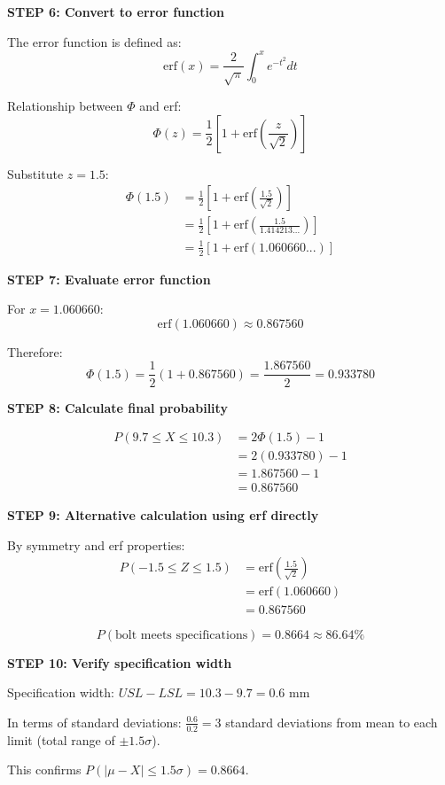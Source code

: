 \documentclass[12pt]{article}
\begin{document}
\begin{solution}
\textbf{STEP 6: Convert to error function}

The error function is defined as:
\[
\text{erf}(x) = \frac{2}{\sqrt{\pi}}\int_0^x e^{-t^2}dt
\]

Relationship between $\Phi$ and erf:
\[
\Phi(z) = \frac{1}{2}\left[1 + \text{erf}\left(\frac{z}{\sqrt{2}}\right)\right]
\]

Substitute $z = 1.5$:
\begin{align*}
\Phi(1.5) &= \frac{1}{2}\left[1 + \text{erf}\left(\frac{1.5}{\sqrt{2}}\right)\right] \\
&= \frac{1}{2}\left[1 + \text{erf}\left(\frac{1.5}{1.414213...}\right)\right] \\
&= \frac{1}{2}\left[1 + \text{erf}(1.060660...)\right]
\end{align*}

\textbf{STEP 7: Evaluate error function}

For $x = 1.060660$:
\[
\text{erf}(1.060660) \approx 0.867560
\]

Therefore:
\[
\Phi(1.5) = \frac{1}{2}(1 + 0.867560) = \frac{1.867560}{2} = 0.933780
\]

\textbf{STEP 8: Calculate final probability}

\begin{align*}
P(9.7 \leq X \leq 10.3) &= 2\Phi(1.5) - 1 \\
&= 2(0.933780) - 1 \\
&= 1.867560 - 1 \\
&= 0.867560
\end{align*}

\textbf{STEP 9: Alternative calculation using erf directly}

By symmetry and erf properties:
\begin{align*}
P(-1.5 \leq Z \leq 1.5) &= \text{erf}\left(\frac{1.5}{\sqrt{2}}\right) \\
&= \text{erf}(1.060660) \\
&= 0.867560
\end{align*}

\[
\boxed{P(\text{bolt meets specifications}) = 0.8664 \approx 86.64\%}
\]

\textbf{STEP 10: Verify specification width}

Specification width: $USL - LSL = 10.3 - 9.7 = 0.6$ mm

In terms of standard deviations: $\frac{0.6}{0.2} = 3$ standard deviations from mean to each limit (total range of $\pm 1.5\sigma$).

This confirms $P(|\mu - X| \leq 1.5\sigma) = 0.8664$.

\end{solution}
\end{document}

